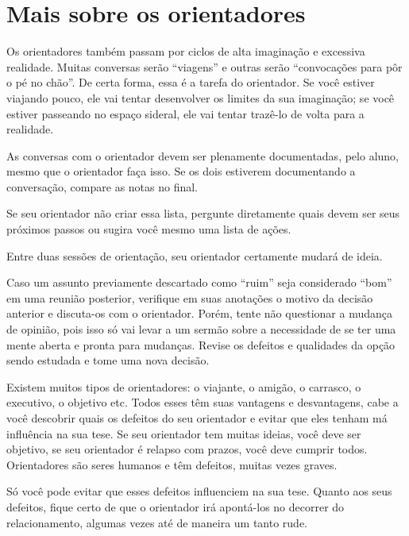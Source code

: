 \section{Mais sobre os orientadores}


Os orientadores também passam por ciclos de alta imaginação e excessiva realidade. Muitas conversas serão ``viagens'' e outras serão ``convocações para pôr o pé no chão''. De certa forma, essa é a tarefa do orientador. Se você estiver viajando pouco, ele vai tentar desenvolver os limites da sua imaginação; se você estiver passeando no espaço sideral, ele vai tentar trazê-lo de volta para a realidade.


As conversas com o orientador devem ser plenamente documentadas, pelo aluno, mesmo que o orientador faça isso. Se os dois estiverem documentando a conversação, compare as notas no final. 




Se seu orientador não criar essa lista, pergunte diretamente quais devem ser seus próximos passos ou sugira você mesmo uma lista de ações. 


Entre duas sessões de orientação, seu orientador certamente mudará de ideia. 




Caso um assunto previamente descartado como ``ruim'' seja considerado ``bom'' em uma reunião posterior, verifique em suas anotações o motivo da decisão anterior e discuta-os com o orientador. Porém, tente não questionar a mudança de opinião, pois isso só vai levar a um sermão sobre a necessidade de se ter uma mente aberta e pronta para mudanças. Revise os defeitos e qualidades da opção sendo estudada e tome uma nova decisão.


Existem muitos tipos de orientadores: o viajante, o amigão, o carrasco, o executivo, o objetivo etc. Todos esses têm suas vantagens e desvantagens, cabe a você descobrir quais os defeitos do seu orientador e evitar que eles tenham má influência na sua tese. Se seu orientador tem muitas ideias, você deve ser objetivo, se seu orientador é relapso com prazos, você deve cumprir todos. Orientadores são seres humanos e têm defeitos, muitas vezes graves. 


Só você pode evitar que esses defeitos influenciem na sua tese. Quanto aos seus defeitos, fique certo de que o orientador irá apontá-los no decorrer do relacionamento, algumas vezes até de maneira um tanto rude.


